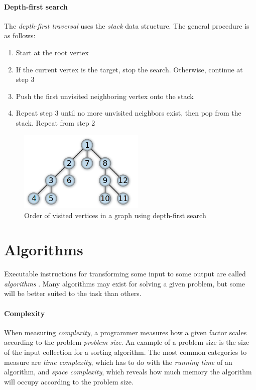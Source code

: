 \documentclass{article}
\begin{document}
\paragraph{Depth-first search}
The {\em depth-first traversal} uses the {\em stack} data structure. The general procedure is as follows:
\begin{enumerate}
\item{Start at the root vertex}
\item{If the current vertex is the target, stop the search. Otherwise, continue at step 3}
\item{Push the first unvisited neighboring vertex onto the stack}
\item{Repeat step 3 until no more unvisited neighbors exist, then pop from the stack. Repeat from step 2}
\end{enumerate}

\begin{figure}[H]
  \centering
  \includegraphics[width=6cm]{depth_first_search}
  \caption{Order of visited vertices in a graph using depth-first search \cite{dfs}}
\end{figure}


\newpage


\section{Algorithms}
Executable instructions for transforming some input to some output are called {\em algorithms}
 \cite[p.5]{introduction-to-algorithms}. Many algorithms may exist for solving a given problem, but some will be better suited
to the task than others.

\paragraph{Complexity}
When measuring {\em complexity}, a programmer measures how a given factor scales according to the problem {\em problem size}.
An example of a problem size is the size of the input collection for a sorting algorithm. The most common categories to measure
are {\em time complexity}, which has to do with the {\em running time} of an algorithm, and {\em space complexity}, which
reveals how much memory the algorithm will occupy according to the problem size.
\end{document}

